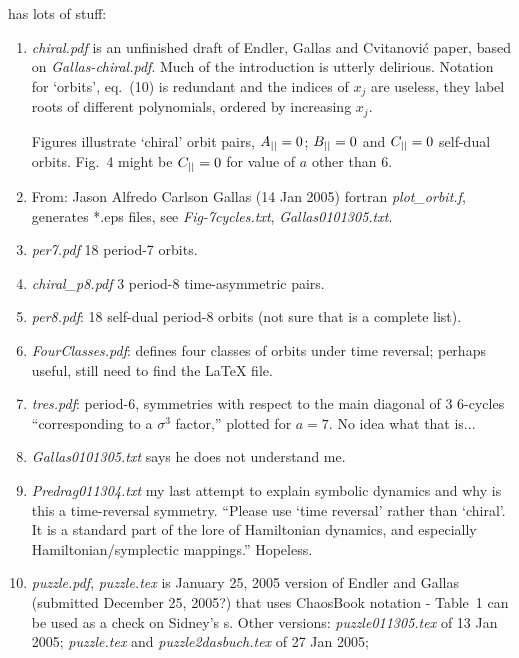  has lots of stuff:
\begin{enumerate}
  \item
\emph{chiral.pdf} is an unfinished draft of Endler, Gallas and
Cvitanovi{\'c} paper, based on {\em Gallas-chiral.pdf}. Much of the
introduction is utterly delirious. Notation for `orbits', eq.~(10)
is redundant and the indices of $x_j$ are useless, they label roots of
different polynomials, ordered by increasing $x_j$.

Figures illustrate `chiral' orbit pairs, $A_{||}=0$;
 $B_{||}=0$ and  $C_{||}=0$ self-dual orbits. Fig.~4 might be
$C_{||}=0$ for value of $a$ other than 6.

  \item
From: Jason Alfredo Carlson Gallas (14 Jan 2005) fortran \emph{plot\_orbit.f},
generates *.eps files, see \emph{Fig-7cycles.txt},
\emph{Gallas0101305.txt}.

  \item
{\em per7.pdf} 18 period-7 orbits.

  \item
{\em chiral\_p8.pdf} 3 period-8 time-asymmetric pairs.

  \item
{\em per8.pdf}: 18 self-dual period-8 orbits (not sure that is a
complete list).

  \item
{\em FourClasses.pdf}: defines four classes of orbits under time reversal;
perhaps useful, still need to find the LaTeX file.

  \item
{\em tres.pdf}: period-6, symmetries with respect to the main diagonal
of 3 6-cycles ``corresponding to a $\sigma^3$ factor,'' plotted for $a=7$.
No idea what that is...

  \item
\emph{Gallas0101305.txt} says he does not understand me.

  \item
\emph{Predrag011304.txt}  my last attempt to explain symbolic dynamics
and why is this a time-reversal symmetry. ``Please use `time reversal'
rather than `chiral'. It is a standard part of the lore of Hamiltonian
dynamics, and especially Hamiltonian/symplectic mappings.'' Hopeless.

  \item
{\em puzzle.pdf}, {\em puzzle.tex} is January 25, 2005 version of Endler and
Gallas (submitted December 25, 2005?) that uses ChaosBook
notation - Table~1 can be used as a check on Sidney's \po s.
Other versions:
{\em puzzle011305.tex}  of 13 Jan 2005;
 {\em puzzle.tex} and {\em puzzle2dasbuch.tex} of 27 Jan 2005;


\end{enumerate}
